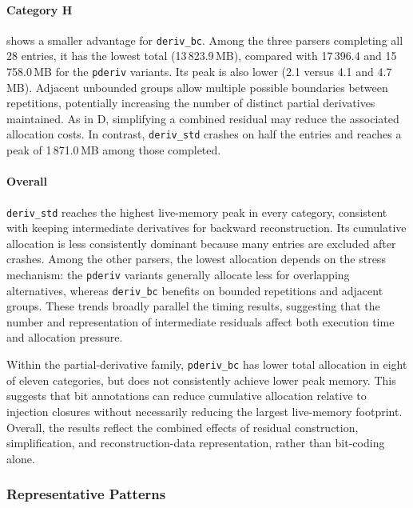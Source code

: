 \paragraph{Category H}
shows a smaller advantage for \texttt{deriv\_bc}.
Among the three parsers completing all
28 entries, it has the lowest total
(13\,823.9\,MB), compared with
17\,396.4 and 15\,758.0\,MB for
the \texttt{pderiv} variants.
Its peak is also lower
(2.1 versus 4.1 and 4.7\,MB).
Adjacent unbounded groups allow multiple
possible boundaries between repetitions,
potentially increasing the number of
distinct partial derivatives maintained.
As in D, simplifying a combined residual
may reduce the associated allocation costs.
In contrast, \texttt{deriv\_std} crashes
on half the entries and reaches a peak
of 1\,871.0\,MB among those completed.

\paragraph{Overall}
\texttt{deriv\_std} reaches the highest
live-memory peak in every category,
consistent with keeping intermediate
derivatives for backward reconstruction.
Its cumulative allocation is less consistently
dominant because many entries are excluded
after crashes.
Among the other parsers, the lowest allocation
depends on the stress mechanism:
the \texttt{pderiv} variants generally
allocate less for overlapping alternatives,
whereas \texttt{deriv\_bc} benefits on
bounded repetitions and adjacent groups.
These trends broadly parallel the timing results,
suggesting that the number and representation
of intermediate residuals affect both execution
time and allocation pressure.

Within the partial-derivative family,
\texttt{pderiv\_bc} has lower total allocation
in eight of eleven categories, but does not
consistently achieve lower peak memory.
This suggests that bit annotations can reduce
cumulative allocation relative to injection
closures without necessarily reducing the
largest live-memory footprint.
Overall, the results reflect the combined effects
of residual construction, simplification,
and reconstruction-data representation,
rather than bit-coding alone.

%
%
%

\subsubsection{Representative Patterns}
\label{sec:eval-memory-representative}


